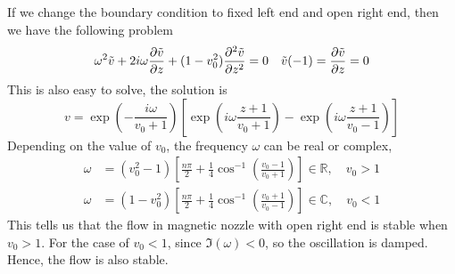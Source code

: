 If we change the boundary condition to fixed left end and open right end, then we have the following problem
\begin{equation} \label{eq:constant_v_problem_openright}
    \omega^2\tilde{v} + 2i\omega\pdv{\tilde{v}}{z} + (1-v_0^2)\pdv[2]{\tilde{v}}{z} = 0
    \quad
    \tilde{v}(-1) = \pdv{\tilde{v}}{z}(1) = 0
\end{equation}
This is also easy to solve, the solution is 
\begin{equation} \label{eq:constant_v_solution_openright}
    v = \exp\left(-\frac{i\omega}{v_0+1}\right)\left[ \exp\left(i\omega\frac{z+1}{v_0+1}\right) - \exp\left(i\omega\frac{z+1}{v_0-1}\right) \right]
\end{equation} 
Depending on the value of $v_0$, the frequency $\omega$ can be real or complex,
\begin{equation}
    \begin{aligned}
        \omega &= (v_0^2-1) \left[ \frac{n\pi}{2} + \frac{1}{4}\cos^{-1}\left(\frac{v_0-1}{v_0+1}\right) \right] \in\mathbb{R}, \quad v_0>1 \\
        \omega &= (1-v_0^2) \left[ \frac{n\pi}{2} + \frac{1}{4}\cos^{-1}\left(\frac{v_0+1}{v_0-1}\right) \right] \in\mathbb{C}, \quad v_0<1
    \end{aligned}
\end{equation}
This tells us that the flow in magnetic nozzle with open right end is stable when $v_0>1$. For the case of $v_0<1$, since $\Im(\omega)<0$, so the oscillation is damped. Hence, the flow is also stable.

